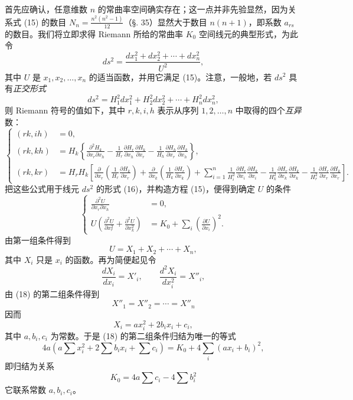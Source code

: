 首先应确认，任意维数 \(n\) 的常曲率空间确实存在；这一点并非先验显然，因为关系式 (15) 的数目 \(N_n=\frac{n^2(n^2-1)}{12}\)（\S. 35）显然大于数目 \(n(n+1)\)，即系数 \(a_{rs}\) 的数目。我们将立即求得 Riemann 所给的常曲率 \(K_0\) 空间线元的典型形式，为此令
\begin{equation}\tag{16}
 ds^2=\frac{dx_1^2+dx_2^2+\cdots+dx_n^2}{U^2},
\end{equation}
其中 \(U\) 是 \(x_1,x_2,\ldots,x_n\) 的适当函数，并用它满足 (15)。注意，一般地，若 \(ds^2\) 具有\emph{正交形式}
\[
 ds^2=H_1^2dx_1^2+H_2^2dx_2^2+
\cdots+H_n^2dx_n^2,
\]
则 Riemann 符号的值如下，其中 \(r,k,i,h\) 表示从序列 \(1,2,\ldots,n\) 中取得的四个\emph{互异}数：
{\fontsize{9}{10.5}\selectfont
\begin{equation}\tag{17}
\left\{
\begin{aligned}
(rk,ih)&=0,\\
(rk,kh)&=H_k\left\{\frac{\partial^2H_k}{\partial x_r\partial x_h}
 -\frac1{H_r}\frac{\partial H_r}{\partial x_h}\frac{\partial H_k}{\partial x_r}
 -\frac1{H_h}\frac{\partial H_h}{\partial x_r}\frac{\partial H_k}{\partial x_h}\right\},\\
(rk,kr)&=H_rH_k\left[\frac{\partial}{\partial x_r}\left(\frac1{H_r}\frac{\partial H_k}{\partial x_r}\right)
 +\frac{\partial}{\partial x_k}\left(\frac1{H_k}\frac{\partial H_r}{\partial x_k}\right)
 +\sum_{i=1}^{n}\frac1{H_i^2}\frac{\partial H_r}{\partial x_i}\frac{\partial H_k}{\partial x_i}
 -\frac1{H_k^2}\frac{\partial H_r}{\partial x_k}\frac{\partial H_k}{\partial x_k}
 -\frac1{H_r^2}\frac{\partial H_r}{\partial x_r}\frac{\partial H_k}{\partial x_r}\right].
\end{aligned}
\right.
\end{equation}
}
把这些公式用于线元 \(ds^2\) 的形式 (16)，并构造方程 (15)，便得到确定 \(U\) 的条件
\begin{equation}\tag{18}
\left\{
\begin{aligned}
 \frac{\partial^2U}{\partial x_r\partial x_h}&=0,\\
 U\left(\frac{\partial^2U}{\partial x_r^2}+\frac{\partial^2U}{\partial x_k^2}\right)
 &=K_0+\sum_i\left(\frac{\partial U}{\partial x_i}\right)^2.
\end{aligned}
\right.
\end{equation}
由第一组条件得到
\[
 U=X_1+X_2+
\cdots+X_n,
\]
其中 \(X_i\) 只是 \(x_i\) 的函数。再为简便起见令
\[
 \frac{dX_i}{dx_i}=X'_i,
 \qquad
 \frac{d^2X_i}{dx_i^2}=X''_i,
\]
由 (18) 的第二组条件得到
\[
 X''_1=X''_2=
\cdots=X''_n
\]
因而
\[
 X_i=ax_i^2+2b_ix_i+c_i,
\]
其中 \(a,b_i,c_i\) 为常数。于是 (18) 的第二组条件归结为唯一的等式
\[
 4a\left(a\sum x_i^2+2\sum b_ix_i+\sum c_i\right)=K_0+4\sum_i(ax_i+b_i)^2,
\]
即归结为关系
\begin{equation}\tag{19}
 K_0=4a\sum c_i-4\sum b_i^2
\end{equation}
它联系常数 \(a,b_i,c_i\)。

